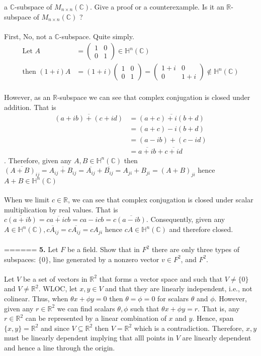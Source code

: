 \documentclass[11pt]{amsart}
\theoremstyle{definition}  %
\newcommand{\R}{\mathbb{R}}
\newcommand{\C}{\mathbb{C}}
\begin{document}
a $\C$-subspace of $M_{n \times n}(\C)$. Give a proof or a counterexample. Is it an $\R$-subspace of $M_{n \times n}(\C)$ ? \\
\\
First, No, not a $\C$-subspace.  Quite simply.
\begin{align*}
	\text{Let } A &= \left ( \begin{array}{cc}
		1 & 0 \\
		0 & 1
\end{array}	 \right ) \in \mathbb{H}^n(\C) \\
	\text{then } (1+i)A &= (1+i)\left ( \begin{array}{cc}
		1 & 0 \\
		0 & 1
\end{array}	 \right ) = \left ( \begin{array}{cc}
		1+i & 0 \\
		0 & 1+i
\end{array}	 \right ) \not \in \mathbb{H}^n(\C)
\end{align*}
\\
However, as an $\R$-subspace we can see that complex conjugation is closed under addition.  That is 
\begin{align*}
	\overline{(a+ib)+(c+id)} &= \overline{(a+c)+i(b+d)} \\
	&= (a+c)-i(b+d) \\
	&= (a-ib)+(c-id) \\
	&= \overline{a+ib}+\overline{c+id}
\end{align*}.  Therefore, given any $A,B \in \mathbb{H}^n(\C)$ then $\overline{(A+B)_{ij}}= \overline{A_{ij}+B_{ij}} = \overline{A_{ij}}+\overline{B_{ij}} = A_{ji}+B_{ji} = (A+B)_{ji}$ hence $A+B \in \mathbb{H}^n(\C)$
\\ \\
When we limit $c \in \R$, we can see that complex conjugation is closed under scalar multiplication by real values.  That is $\overline{c(a+ib)} = \overline{ca+icb} = ca-icb = c\overline{(a-ib)}$.  Consequently, given any $A \in \mathbb{H}^n(\C), \overline{cA_{ij}}= c\overline{A_{ij}}=cA_{ji}$ hence $cA \in \mathbb{H}^n(\C)$ and therefore closed.\\
\\
======
\vskip 0.1cm
\noindent
{\bf 5.} Let $F$ be a field. Show that in $F^2$ there are only three types of subspaces: $\{0\}$, line generated by a nonzero vector $v \in F^2$, and $F^2$. \\
\\
Let $V$ be a set of vectors in $\R^2$ that forms a vector space and such that $V \ne \{0\}$ and $V\ne \R^2$.  WLOC, let $x, y \in V$ and that they are linearly independent, i.e., not colinear.   Thus, when $\theta x + \phi y = 0$ then $\theta = \phi = 0$ for scalars $\theta$ and $\phi$.  However, given any $r \in \R^2$ we can find scalars $\theta, \phi$ such that $\theta x + \phi y = r$.  That is, any $r \in \R^2$ can be represented by a linear combination of $x$ and $y$. Hence, span$ \{x,y\} = \R^2$ and since $V \subseteq \R^2$ then $V = \R^2$ which is a contradiction.  Therefore, $x,y$ must be linearly dependent implying that alll points in $V$ are linearly dependent and hence a line through the origin.\\
\end{document}
